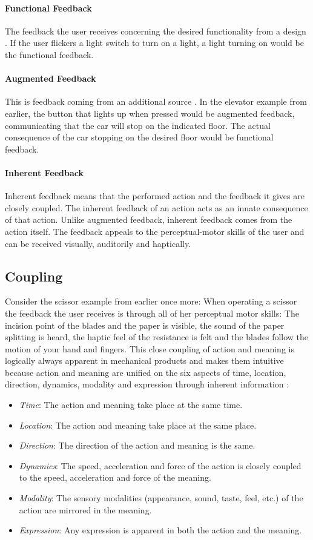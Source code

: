 \paragraph{Functional Feedback} The feedback the user receives concerning the desired functionality from a design \cite{frogger}. If the user flickers a light switch to turn on a light, a light turning on would be the functional feedback.
\paragraph{Augmented Feedback} This is feedback coming from an additional source \cite{frogger}. In the elevator example from earlier, the button that lights up when pressed would be augmented feedback, communicating that the car will stop on the indicated floor. The actual consequence of the car stopping on the desired floor would be functional feedback.
\paragraph{Inherent Feedback} Inherent feedback means that the performed action and the feedback it gives are closely coupled. The inherent feedback of an action acts as an innate consequence of that action. Unlike augmented feedback, inherent feedback comes from the action itself. The feedback appeals to the perceptual-motor skills of the user and can be received visually, auditorily and haptically.

\subsection{Coupling}
Consider the scissor example from earlier once more: When operating a scissor the feedback the user receives is through all of her perceptual motor skills: The incision point of the blades and the paper is visible, the sound of the paper splitting is heard, the haptic feel of the resistance is felt and the blades follow the motion of your hand and fingers. This close coupling of action and meaning is logically always apparent in mechanical products and makes them intuitive because action and meaning are unified on the six aspects of time, location, direction, dynamics, modality and expression through inherent information \cite{frogger} \cite{transbehav}:
\begin{itemize}
  \item \textit{Time}: The action and meaning take place at the same time.
  \item \textit{Location}: The action and meaning take place at the same place.
  \item \textit{Direction}: The direction of the action and meaning is the same.
  \item \textit{Dynamics}: The speed, acceleration and force of the action is closely coupled to the speed, acceleration and force of the meaning.
  \item \textit{Modality}: The sensory modalities (appearance, sound, taste, feel, etc.) of the action are mirrored in the meaning.
  \item \textit{Expression}: Any expression is apparent in both the action and the meaning.
\end{itemize}

